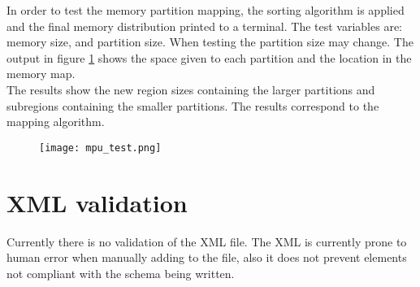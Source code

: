 %
%
In order to test the memory partition mapping,
the sorting algorithm is applied and the final memory distribution printed to a terminal.
The test variables are:
memory size,
and partition size.
When testing the partition size may change.
The output in figure \ref{fig:testing_mpu} shows the space given to each partition and the location
in the memory map.\\
The results show the new region sizes containing the larger partitions and subregions containing the smaller partitions.
The results correspond to the mapping algorithm.

\begin{figure}[H]
	\centering\texttt{[image: mpu\_test.png]}
	\label{fig:testing_mpu}
\end{figure}


\section{XML validation}
Currently there is no validation of the XML file.
The XML is currently prone to human error when manually
adding to the file, also it does not prevent elements
not compliant with the schema being written.


